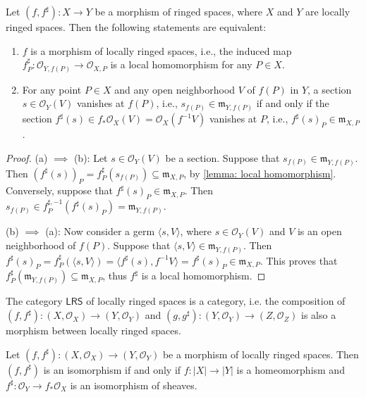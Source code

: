 \documentclass[11pt]{article}
\begin{document}
\begin{lemma}
  \label{lemma: induced local homomorphism}
  \cite{EisenbudHarris}
  Let $ (f,f^{\sharp}): X \to Y $ be a morphism of ringed spaces, where $ X $ and $ Y $ are locally ringed 
  spaces. Then the following statements are equivalent: 
  \begin{enumerate}[label = (\alph*)]
    \item $ f $ is a morphism of locally ringed spaces, i.e., the induced map 
  $ f_{P}^{\sharp} : \mathscr{O}_{Y,f(P)} \to \mathscr{O}_{X,P} $ is a local homomorphism for any $ P \in X $.  
    \item For any point $ P \in X $ and any open neighborhood $ V $ of $ f(P) $ in $ Y $, a section 
    $ s \in \mathscr{O}_{Y}(V) $ vanishes at $ f(P) $, i.e., $ s_{f(P)} \in \mathfrak{m}_{Y,f(P)} $ 
    if and only if the section 
    $ f^{\sharp}(s) \in f_{*}\mathscr{O}_{X}(V)=\mathscr{O}_{X}(f^{-1}V) $ vanishes at $ P $, 
    i.e., $ f^{\sharp}(s)_{P} \in \mathfrak{m}_{X,P}$.  
  \end{enumerate}
\end{lemma}

\begin{proof}
  (a) $ \implies $ (b): 
  Let $ s \in \mathscr{O}_{Y}(V) $ be a section. Suppose that  
  $ s_{f(P)} \in \mathfrak{m}_{Y,f(P)} $. 
  Then $ (f^{\sharp}(s))_{P} = f^{\sharp}_{P}(s_{f(P)}) \subseteq \mathfrak{m}_{X,P} $, 
  by \autoref{lemma: local homomorphism}. 
  Conversely, suppose that $ f^{\sharp}(s)_{P} \in \mathfrak{m}_{X,P} $. 
  Then $ s_{f(P)} \in f^{\sharp,-1}_{P}(f^{\sharp}(s)_{P}) = \mathfrak{m}_{Y,f(P)} $. 

  (b) $ \implies  $ (a): 
  Now consider a germ $ \langle s,V \rangle $, where $ s \in \mathscr{O}_{Y}(V) $ 
  and $ V $ is an open neighborhood of $ f(P) $. 
  Suppose that $ \langle s,V \rangle \in \mathfrak{m}_{Y,f(P)} $. 
  Then $ f^{\sharp}(s)_{P}= f^{\sharp}_{P}(\langle s,V \rangle)=\langle f^{\sharp}(s),f^{-1}V \rangle = f^{\sharp}(s)_{P} \in \mathfrak{m}_{X,P}$. 
  This proves that $ f^{\sharp}_{P}(\mathfrak{m}_{Y,f(P)}) \subseteq \mathfrak{m}_{X,P} $, 
  thus $ f^{\sharp} $ is a local homomorphism. 
\end{proof}

\begin{lemma}
    \label{lemma: isomorphism of locally ringed spaces}
    The category $ \mathsf{LRS} $ of locally ringed spaces is a category, 
    i.e. the composition of $(f,f^{\sharp}): (X,\mathscr{O}_{X}) \to (Y,\mathscr{O}_{Y}) $ 
    and $ (g,g^{\sharp}): (Y,\mathscr{O}_{Y}) \to (Z,\mathscr{O}_{Z}) $ is also a morphism 
    between locally ringed spaces. 

    Let $ (f,f^{\sharp}): (X,\mathscr{O}_{X}) \to (Y,\mathscr{O}_{Y}) $ be a morphism of locally ringed spaces. 
    Then $ (f,f^{\sharp}) $ is an isomorphism if and only if $ f:|X| \to |Y| $ is a homeomorphism 
    and $ f^{\sharp}: \mathscr{O}_{Y} \to f_{*}\mathscr{O}_{X} $ is an isomorphism of sheaves. 
\end{lemma}
\end{document}
